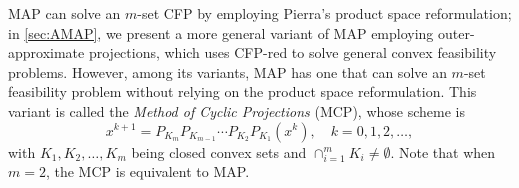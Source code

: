 \documentclass[smallextended,numbook,nospthms]{svjour3}
\theoremstyle{plain}
\theoremstyle{definition}
\begin{document}
MAP can solve an $m$-set CFP by employing Pierra's product space reformulation; in \cref{sec:AMAP}, we present a more general variant of MAP employing outer-approximate projections, which uses CFP-red to solve general convex feasibility problems. However, among its variants, MAP has one that can solve an $m$-set feasibility problem without relying on the product space reformulation. This variant is called the \emph{Method of Cyclic Projections} (MCP), whose scheme is
\begin{equation}
	x^{k+1}=P_{K_{m}}P_{K_{m-1}} \cdots P_{K_{2}}P_{K_{1}}\left(x^{k}\right), \quad k=0,1,2, \ldots, \label{eq:MCP}
\end{equation}
with $K_1, K_2, \ldots, K_m$ being closed convex sets and $\cap_{i=1}^{m} K_i \not = \emptyset$. Note that when $m=2$, the MCP is equivalent to MAP.
\end{document}
